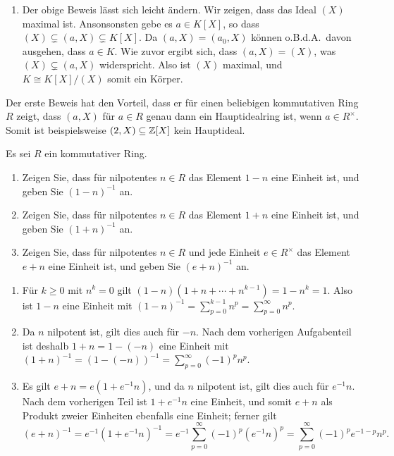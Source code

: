 \begin{solution}
\begin{enumerate}
    \item
      Der obige Beweis lässt sich leicht ändern.
      Wir zeigen, dass das Ideal $(X)$ maximal ist.
      Ansonsonsten gebe es $a \in K[X]$, so dass $(X) \subsetneq (a, X) \subsetneq K[X]$.
      Da $(a, X) = (a_0, X)$ können o.B.d.A.\ davon ausgehen, dass $a \in K$.
      Wie zuvor ergibt sich, dass $(a, X) = (X)$, was $(X) \subsetneq (a,X)$ widerspricht.
      Also ist $(X)$ maximal, und $K \cong K[X]/(X)$ somit ein Körper.
  \end{enumerate}
  Der erste Beweis hat den Vorteil, dass er für einen beliebigen kommutativen Ring $R$ zeigt, dass $(a, X)$ für $a \in R$ genau dann ein Hauptidealring ist, wenn $a \in R^\times$.
  Somit ist beispielsweise $(2, X) \subseteq \mathbb{Z}[X]$ kein Hauptideal.
\end{solution}



\begin{question}[subtitle = Nilpotente zu Einheiten]
  Es sei $R$ ein kommutativer Ring.
  \begin{enumerate}
    \item
      Zeigen Sie, dass für nilpotentes $n \in R$ das Element $1 - n$ eine Einheit ist, und geben Sie $(1 - n)^{-1}$ an.
    \item
      Zeigen Sie, dass für nilpotentes $n \in R$ das Element $1 + n$ eine Einheit ist, und geben Sie $(1 + n)^{-1}$ an.
    \item
      Zeigen Sie, dass für nilpotentes $n \in R$ und jede Einheit $e \in R^\times$ das Element $e + n$ eine Einheit ist, und geben Sie $(e + n)^{-1}$ an.
  \end{enumerate}
\end{question}


\begin{solution}
  \begin{enumerate}
    \item
      Für $k \geq 0$ mit $n^k = 0$ gilt $(1 - n)(1 + n + \dotsb + n^{k-1}) = 1 - n^k = 1$.
      Also ist $1 - n$ eine Einheit mit $(1-n)^{-1} = \sum_{p=0}^{k-1} n^p = \sum_{p=0}^\infty n^p$.
    \item
      Da $n$ nilpotent ist, gilt dies auch für $-n$.
      Nach dem vorherigen Aufgabenteil ist deshalb $1 + n = 1 - (-n)$ eine Einheit mit $(1 + n)^{-1} = (1 - (-n))^{-1} = \sum_{p=0}^\infty (-1)^p n^p$.
    \item
      Es gilt $e + n = e(1 + e^{-1} n)$, und da $n$ nilpotent ist, gilt dies auch für $e^{-1} n$.
      Nach dem vorherigen Teil ist $1 + e^{-1} n$ eine Einheit, und somit $e + n$ als Produkt zweier Einheiten ebenfalls eine Einheit; ferner gilt
      \[
          (e + n)^{-1}
        = e^{-1} (1 + e^{-1} n)^{-1}
        = e^{-1} \sum_{p=0}^\infty (-1)^p (e^{-1} n)^p
        = \sum_{p=0}^\infty (-1)^p e^{-1-p} n^p.
      \]
  \end{enumerate}
\end{solution}



